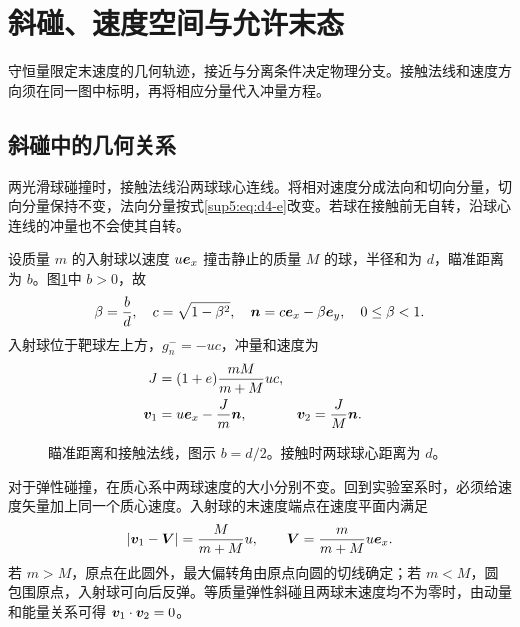 \section{斜碰、速度空间与允许末态}

守恒量限定末速度的几何轨迹，接近与分离条件决定物理分支。接触法线和速度方向须在同一图中标明，再将相应分量代入冲量方程。



\subsection{斜碰中的几何关系}
两光滑球碰撞时，接触法线沿两球球心连线。将相对速度分成法向和切向分量，切向分量保持不变，法向分量按式\eqref{sup5:eq:d4-e}改变。若球在接触前无自转，沿球心连线的冲量也不会使其自转。

设质量 $m$ 的入射球以速度 $u\bm{e}_x$ 撞击静止的质量 $M$ 的球，半径和为 $d$，瞄准距离为 $b$。图\ref{sup5:fig:d4-t3}中 $b>0$，故
\begin{equation}
 \beta=\frac b d,\quad c=\sqrt{1-\beta^2},\quad
 \bm{n}=c\bm{e}_x-\beta\bm{e}_y,\quad 0\le\beta<1.
\end{equation}
入射球位于靶球左上方，$g_n^-=-uc$，冲量和速度为
\begin{align}\label{sup5:eq:d4-oblique}
 J&=(1+e)\frac{mM}{m+M}uc,\\
 \bm{v}_1&=u\bm{e}_x-\frac Jm\bm{n},
 &\bm{v}_2&=\frac JM\bm{n}.
\end{align}

\begin{figure}[H]\centering
{}
\caption{瞄准距离和接触法线，图示 $b=d/2$。接触时两球球心距离为 $d$。}\label{sup5:fig:d4-t3}
\end{figure}

对于弹性碰撞，在质心系中两球速度的大小分别不变。回到实验室系时，必须给速度矢量加上同一个质心速度。入射球的末速度端点在速度平面内满足
\begin{equation}\label{sup5:eq:d4-circle}
 |\bm{v}_1-\bm{V}|=\frac{M}{m+M}u,\qquad
 \bm{V}=\frac{m}{m+M}u\bm{e}_x.
\end{equation}
若 $m>M$，原点在此圆外，最大偏转角由原点向圆的切线确定；若 $m<M$，圆包围原点，入射球可向后反弹。等质量弹性斜碰且两球末速度均不为零时，由动量和能量关系可得 $\bm{v}_1\cdot\bm{v}_2=0$。


